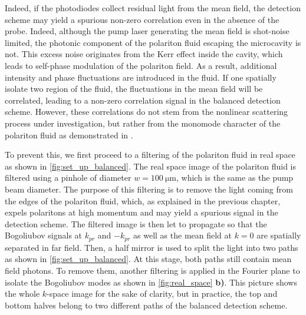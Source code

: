 \indent Indeed, if the photodiodes collect residual light from the mean field, the detection scheme may yield a spurious non-zero correlation even in the absence of the probe. Indeed, although the pump laser generating the mean field is shot-noise limited, the photonic component of the polariton fluid escaping the microcavity is not.
This excess noise originates from the Kerr effect inside the cavity, which leads to self-phase modulation of the polariton field. As a result, additional intensity and phase fluctuations are introduced in the fluid. If one spatially isolate two region of the fluid, the fluctuations in the mean field will be correlated, leading to a non-zero correlation signal in the balanced detection scheme.
However, these correlations do not stem from the nonlinear scattering process under investigation, but rather from the monomode character of the polariton fluid as demonstrated in \cite{a_baas_quantum_degeneracy2006}.

\bigskip

\indent To prevent this, we first proceed to a filtering of the polariton fluid in real space as shown in \autoref{fig:set_up_balanced}. The real space image of the polariton fluid is filtered using a pinhole of diameter $w=\SI{100}{\micro\meter}$, which is the same as the pump beam diameter.
The purpose of this filtering is to remove the light coming from the edges of the polariton fluid, which, as explained in the previous chapter, expels polaritons at high momentum and may yield a spurious signal in the detection scheme.
The filtered image is then let to propagate so that the Bogoliubov signals at $k_{pr}$ and $-k_{pr}$ as well as the mean field at $k=0$ are spatially separated in far field. Then, a half mirror is used to split the light into two paths as shown in \autoref{fig:set_up_balanced}.
At this stage, both paths still contain mean field photons. To remove them, another filtering is applied in the Fourier plane to isolate the Bogoliubov modes as shown in \autoref{fig:real_space} \textbf{b)}. This picture shows the whole $k$-space image for the sake of clarity, but in practice,
the top and bottom halves belong to two different paths of the balanced detection scheme.


